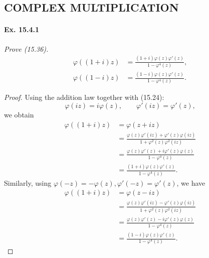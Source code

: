\documentclass[11pt,a4paper]{article}
\begin{document}
\subsection{COMPLEX MULTIPLICATION}

\paragraph{Ex. 15.4.1}{\it Prove (15.36).
\begin{align*}
\varphi\left((1+i)z\right) &= \frac{(1+i) \varphi(z) \varphi'(z)}{1 - \varphi^4(z)},\\
\varphi\left((1-i)z\right) &= \frac{(1-i) \varphi(z) \varphi'(z)}{1 - \varphi^4(z)}.
\end{align*}
}

\begin{proof} Using the addition law together with (15.24):
$$\varphi(iz) = i \varphi(z), \qquad \varphi'(iz) = \varphi'(z),$$
 we obtain
\begin{align*}
\varphi((1+i)z) &= \varphi(z+iz)\\
&=\frac{\varphi(z) \varphi'(iz) + \varphi'(z) \varphi(iz)}{1 + \varphi^2(z) \varphi^2(iz)}\\
&=\frac{\varphi(z) \varphi'(z) + i\varphi'(z) \varphi(z)}{1 - \varphi^4(z)}\\
&=\frac{(1+i) \varphi(z) \varphi'(z)}{1 - \varphi^4(z)}.
\end{align*}
Similarly, using $\varphi(-z) = - \varphi(z), \varphi'(-z) = \varphi'(z)$, we have
\begin{align*}
\varphi((1+i)z) &= \varphi(z-iz)\\
&=\frac{\varphi(z) \varphi'(iz) - \varphi'(z) \varphi(iz)}{1 + \varphi^2(z) \varphi^2(iz)}\\
&=\frac{\varphi(z) \varphi'(z) - i\varphi'(z) \varphi(z)}{1 - \varphi^4(z)}\\
&=\frac{(1-i) \varphi(z) \varphi'(z)}{1 - \varphi^4(z)}.
\end{align*}
\end{proof} 
\end{document}
